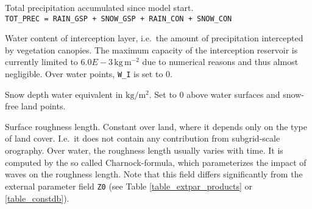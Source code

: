 \begin{description}[leftmargin=3.0cm,style=sameline]
 \item [TOT\_PREC] Total precipitation accumulated since model start.\\
                \texttt{TOT\_PREC = RAIN\_GSP + SNOW\_GSP + RAIN\_CON + SNOW\_CON}
                
 \item [W\_I]   Water content of interception layer, i.e.\ the amount of precipitation intercepted by vegetation canopies. The maximum 
                capacity of the interception reservoir is currently limited to $6.0E-3\,\mathrm{kg\,m^{-2}}$ due to numerical reasons 
                and thus almost negligible. Over water points, \texttt{W\_I} is set to 0.

 \item[W\_SNOW] Snow depth water equivalent in $\mathrm{kg/m^{2}}$. Set to 0 above water surfaces and snow-free land points.
 
 \item [Z0]     Surface roughness length. Constant over land, where it depends only on the type of land cover. I.e.\ it does 
                not contain any contribution from subgrid-scale orography. Over water, the roughness length usually varies 
                with time. It is computed by the so called Charnock-formula, which parameterizes the impact of waves on the 
                roughness length. Note that this field differs significantly from the external parameter field \texttt{Z0} 
                (see Table \ref{table_extpar_products} or \ref{table_constdb}).  
\end{description}


